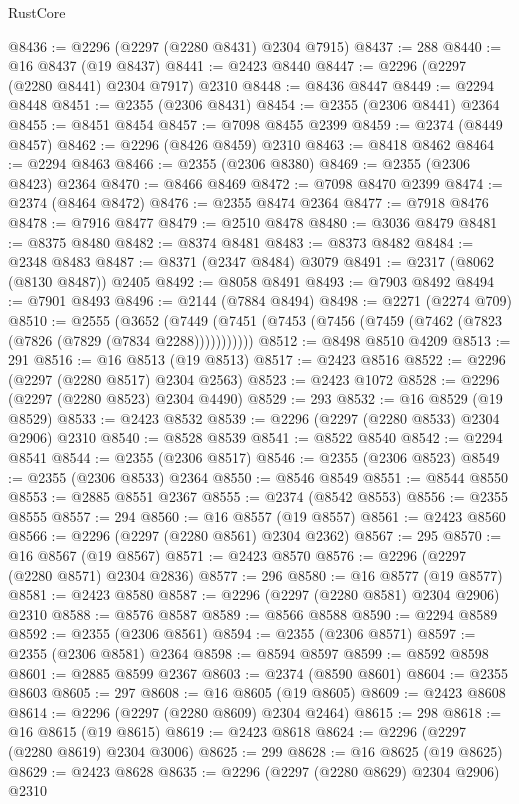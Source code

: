 \begin{lexlean}{RustCore}
\begin{coremodule}
@8436 := @2296 (@2297 (@2280 @8431) @2304 @7915)
@8437 := 288
@8440 := @16 @8437 (@19 @8437)
@8441 := @2423 @8440
@8447 := @2296 (@2297 (@2280 @8441) @2304 @7917) @2310
@8448 := @8436 @8447
@8449 := @2294 @8448
@8451 := @2355 (@2306 @8431)
@8454 := @2355 (@2306 @8441) @2364
@8455 := @8451 @8454
@8457 := @7098 @8455 @2399
@8459 := @2374 (@8449 @8457)
@8462 := @2296 (@8426 @8459) @2310
@8463 := @8418 @8462
@8464 := @2294 @8463
@8466 := @2355 (@2306 @8380)
@8469 := @2355 (@2306 @8423) @2364
@8470 := @8466 @8469
@8472 := @7098 @8470 @2399
@8474 := @2374 (@8464 @8472)
@8476 := @2355 @8474 @2364
@8477 := @7918 @8476
@8478 := @7916 @8477
@8479 := @2510 @8478
@8480 := @3036 @8479
@8481 := @8375 @8480
@8482 := @8374 @8481
@8483 := @8373 @8482
@8484 := @2348 @8483
@8487 := @8371 (@2347 @8484) @3079
@8491 := @2317 (@8062 (@8130 @8487)) @2405
@8492 := @8058 @8491
@8493 := @7903 @8492
@8494 := @7901 @8493
@8496 := @2144 (@7884 @8494)
@8498 := @2271 (@2274 @709)
@8510 := @2555
    (@3652 (@7449 (@7451 (@7453 (@7456 (@7459 (@7462 (@7823 (@7826 (@7829 (@7834 @2288)))))))))))
@8512 := @8498 @8510 @4209
@8513 := 291
@8516 := @16 @8513 (@19 @8513)
@8517 := @2423 @8516
@8522 := @2296 (@2297 (@2280 @8517) @2304 @2563)
@8523 := @2423 @1072
@8528 := @2296 (@2297 (@2280 @8523) @2304 @4490)
@8529 := 293
@8532 := @16 @8529 (@19 @8529)
@8533 := @2423 @8532
@8539 := @2296 (@2297 (@2280 @8533) @2304 @2906) @2310
@8540 := @8528 @8539
@8541 := @8522 @8540
@8542 := @2294 @8541
@8544 := @2355 (@2306 @8517)
@8546 := @2355 (@2306 @8523)
@8549 := @2355 (@2306 @8533) @2364
@8550 := @8546 @8549
@8551 := @8544 @8550
@8553 := @2885 @8551 @2367
@8555 := @2374 (@8542 @8553)
@8556 := @2355 @8555
@8557 := 294
@8560 := @16 @8557 (@19 @8557)
@8561 := @2423 @8560
@8566 := @2296 (@2297 (@2280 @8561) @2304 @2362)
@8567 := 295
@8570 := @16 @8567 (@19 @8567)
@8571 := @2423 @8570
@8576 := @2296 (@2297 (@2280 @8571) @2304 @2836)
@8577 := 296
@8580 := @16 @8577 (@19 @8577)
@8581 := @2423 @8580
@8587 := @2296 (@2297 (@2280 @8581) @2304 @2906) @2310
@8588 := @8576 @8587
@8589 := @8566 @8588
@8590 := @2294 @8589
@8592 := @2355 (@2306 @8561)
@8594 := @2355 (@2306 @8571)
@8597 := @2355 (@2306 @8581) @2364
@8598 := @8594 @8597
@8599 := @8592 @8598
@8601 := @2885 @8599 @2367
@8603 := @2374 (@8590 @8601)
@8604 := @2355 @8603
@8605 := 297
@8608 := @16 @8605 (@19 @8605)
@8609 := @2423 @8608
@8614 := @2296 (@2297 (@2280 @8609) @2304 @2464)
@8615 := 298
@8618 := @16 @8615 (@19 @8615)
@8619 := @2423 @8618
@8624 := @2296 (@2297 (@2280 @8619) @2304 @3006)
@8625 := 299
@8628 := @16 @8625 (@19 @8625)
@8629 := @2423 @8628
@8635 := @2296 (@2297 (@2280 @8629) @2304 @2906) @2310

\end{coremodule}
\end{lexlean}
